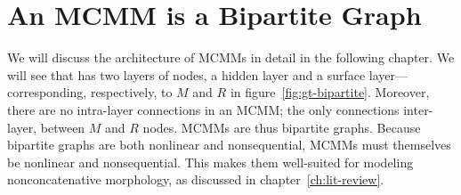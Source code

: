 
\section{An MCMM is a Bipartite Graph}\label{sec:mcmm-bipartite}
We will discuss the architecture of MCMMs in detail in the following chapter. 
We will see  that has two
layers of nodes, a hidden layer and a
surface layer---corresponding, respectively, to $M$ and $R$ in
figure~\ref{fig:gt-bipartite}. Moreover, there are no intra-layer connections in
an MCMM; the only connections inter-layer, between $M$ and $R$ nodes.
MCMMs are thus bipartite graphs. Because bipartite graphs 
are both nonlinear and nonsequential, 
MCMMs must themselves be nonlinear and nonsequential. This makes them well-suited for modeling
nonconcatenative morphology, as discussed in chapter~\ref{ch:lit-review}.


%

